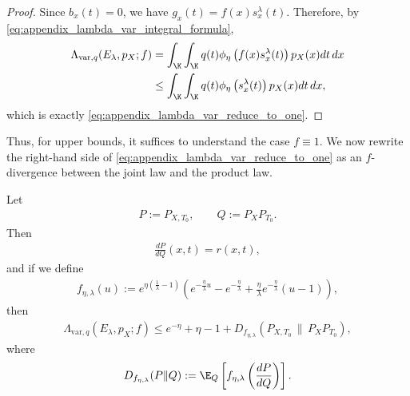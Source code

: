 \begin{proof}
Since $b_x(t)=0$, we have $g_x(t)=f(x)s_x^\lambda(t)$. Therefore, by
\eqref{eq:appendix_lambda_var_integral_formula},
\begin{align*}
    \Lambda_{\mathrm{var}, q}(E_\lambda, p_X; f)
     & = \int_\K\int_\K q(t)\phi_\eta\left(f(x)s_x^\lambda(t)\right)p_X(x)dt\,dx \\
     & \leq \int_\K\int_\K q(t)\phi_\eta\left(s_x^\lambda(t)\right)p_X(x)dt\,dx,
\end{align*}
which is exactly \eqref{eq:appendix_lambda_var_reduce_to_one}.
\end{proof}

Thus, for upper bounds, it suffices to understand the case $f \equiv 1$.
We now rewrite the right-hand side of \eqref{eq:appendix_lambda_var_reduce_to_one} as an $f$-divergence between the joint law and the product law.

\begin{proposition}
\label{prop:appendix_f_divergence_representation}
Let
\begin{align*}
    P := P_{X,T_0},
    \qquad
    Q := P_X P_{T_0}.
\end{align*}
Then
\begin{align}
    \frac{dP}{dQ}(x,t) = r(x,t),
    \label{eq:appendix_r_is_likelihood_ratio}
\end{align}
and if we define
\begin{align}
    f_{\eta,\lambda}(u)
    := e^{\eta(\frac{1}{\lambda}-1)}\left(e^{-\frac{\eta}{\lambda}u} - e^{-\frac{\eta}{\lambda}} + \frac{\eta}{\lambda}e^{-\frac{\eta}{\lambda}}(u-1)\right),
    \label{eq:appendix_f_generator_def}
\end{align}
then
\begin{align}
    \Lambda_{\mathrm{var}, q}(E_\lambda, p_X; f)
    \leq
    e^{-\eta} + \eta - 1 + D_{f_{\eta,\lambda}}(P_{X,T_0}\,\|\,P_XP_{T_0}),
    \label{eq:appendix_f_divergence_bound}
\end{align}
where
\begin{align*}
    D_{f_{\eta,\lambda}}(P\|Q)
    := \E_Q\left[f_{\eta,\lambda}\left(\frac{dP}{dQ}\right)\right].
\end{align*}
\end{proposition}

